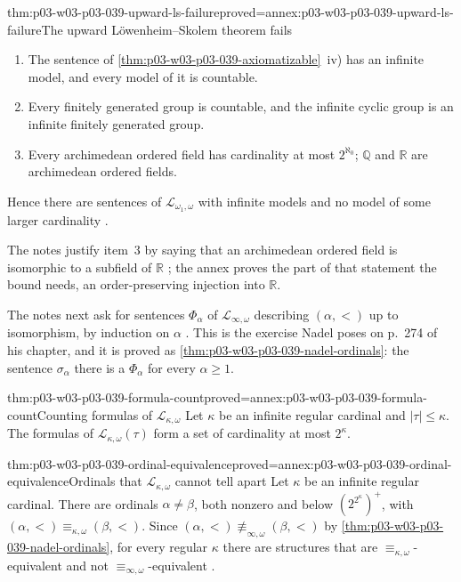 \begin{hbtheorem}{thm:p03-w03-p03-039-upward-ls-failure}{proved=annex:p03-w03-p03-039-upward-ls-failure}{The upward L\"owenheim--Skolem theorem fails}
\begin{enumerate}
\item The sentence of \cref{thm:p03-w03-p03-039-axiomatizable}~iv) has an
      infinite model, and every model of it is countable.
\item Every finitely generated group is countable, and the infinite cyclic
      group is an infinite finitely generated group.
\item Every archimedean ordered field has cardinality at most
      \(2^{\aleph_0}\); \(\mathbb Q\) and \(\mathbb R\) are archimedean ordered
      fields.
\end{enumerate}
Hence there are sentences of \(\mathcal L_{\omega_1,\omega}\) with infinite
models and no model of some larger cardinality
\cite[p.~7]{Marker2014InfinitaryNotes}.
\end{hbtheorem}

The notes justify item~3 by saying that an archimedean ordered field is
isomorphic to a subfield of \(\mathbb R\) \cite[p.~7]{Marker2014InfinitaryNotes};
the annex proves the part of that statement the bound needs, an
order-preserving injection into \(\mathbb R\).

The notes next ask for sentences \(\Phi_\alpha\) of \(\mathcal L_{\infty,\omega}\)
describing \((\alpha,<)\) up to isomorphism, by induction on \(\alpha\)
\cite[Ex.~1.9, p.~7]{Marker2014InfinitaryNotes}. This is the exercise
Nadel poses on p.~274 of his chapter, and it is proved as
\cref{thm:p03-w03-p03-039-nadel-ordinals}: the sentence \(\sigma_\alpha\)
there is a \(\Phi_\alpha\) for every \(\alpha\ge1\).

\begin{hblemma}{thm:p03-w03-p03-039-formula-count}{proved=annex:p03-w03-p03-039-formula-count}{Counting formulas of \(\mathcal L_{\kappa,\omega}\)}
Let \(\kappa\) be an infinite regular cardinal and \(\lvert\tau\rvert\le\kappa\).
The formulas of \(\mathcal L_{\kappa,\omega}(\tau)\) form a set of cardinality
at most \(2^\kappa\).
\end{hblemma}

\begin{hbtheorem}{thm:p03-w03-p03-039-ordinal-equivalence}{proved=annex:p03-w03-p03-039-ordinal-equivalence}{Ordinals that \(\mathcal L_{\kappa,\omega}\) cannot tell apart}
Let \(\kappa\) be an infinite regular cardinal. There are ordinals
\(\alpha\ne\beta\), both nonzero and below \((2^{2^\kappa})^+\), with
\((\alpha,<)\equiv_{\kappa,\omega}(\beta,<)\). Since
\((\alpha,<)\not\equiv_{\infty,\omega}(\beta,<)\) by
\cref{thm:p03-w03-p03-039-nadel-ordinals}, for every regular \(\kappa\) there
are structures that are \(\equiv_{\kappa,\omega}\)-equivalent and not
\(\equiv_{\infty,\omega}\)-equivalent
\cite[Ex.~1.10 and p.~7]{Marker2014InfinitaryNotes}.
\end{hbtheorem}

